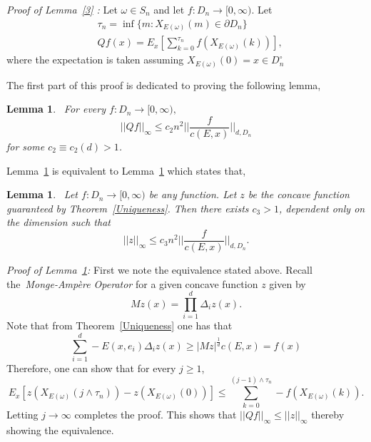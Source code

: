 \documentclass[final]{aomart}
\def\mathscr#1{#1}%
\def\mathbb#1{#1}%
\theoremstyle{plain}
\newtheorem{lemma}[theorem]{Lemma}
\theoremstyle{definition}
\theoremstyle{remark}
\begin{document}
\textit{Proof of Lemma~\ref{3} :}
Let $\omega \in \mathscr{S}_n$ and let $f: D_n \to [0,\infty)$.
Let \begin{align*}
&\tau_n = \inf \{m: X_{\mathscr{E}(\omega)}(m) \in \partial D_n\} \\
&Qf(x)
= \mathbb{E}_x[ \sum_{k=0}^{\tau_n} f(X_{\mathscr{E}(\omega)}(k))],
\end{align*}
where the expectation is taken assuming $X_{{\mathscr{E}(\omega)}}(0) = x \in D_n^{\circ}$ 

The first part of this proof is dedicated to proving the following lemma, \begin{lemma}~\label{old} For every $f: D_n \to [0,\infty),$
    \[||Qf||_{\infty}\leq c_2 n^2||\frac{f}{c(\mathscr{E},x)}||_{d,D_n}
    \]
    for some $c_2\equiv c_2(d)>1$.
\end{lemma}

Lemma~\ref{old} is equivalent to Lemma~\ref{new} which states that, 
\begin{lemma}~\label{new}
    Let $f: D_n \to [0, \infty)$ be any function. Let $z$ be the concave function guaranteed by Theorem~\ref{Uniqueness}. Then there exists $c_3>1$, dependent only on the dimension such that\[
    ||z||_{\infty} \leq c_3  n^2||\frac{f}{c(\mathscr{E},x)}||_{d,D_n}.
    \]
\end{lemma}

\textit{Proof of Lemma~\ref{new}:}  First we note the equivalence stated above. Recall the~\textit{Monge-Ampère Operator} for a given concave function $z$ given by\[
Mz(x) = \prod_{i=1}^{d} \Delta_i z(x).
\] 
Note that from Theorem~\ref{Uniqueness} one has that \[
\sum_{i=1}^d -\mathscr{E}(x,e_i) \Delta_i z(x)  \geq |Mz|^{\frac{1}{d}} c(\mathscr{E},x) = f(x) 
\]
Therefore, one can show that for every $j\geq1$, \[
\mathbb{E}_x[ z(X_{\mathscr{E}(\omega)}(j \wedge \tau_n)) - z(X_{\mathscr{E}(\omega)}(0))] \leq  \sum_{k=0}^{(j-1) \wedge \tau_n} -f(X_{\mathscr{E}(\omega)}(k)).
\]
Letting $j \to \infty $ completes the proof. This shows that $||Qf||_{\infty} \leq ||z||_{\infty}$ thereby showing the equivalence.
\end{document}
